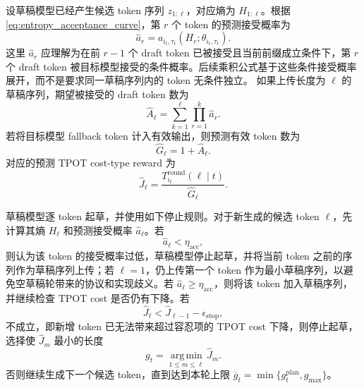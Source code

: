 \documentclass[11pt,a4paper]{ctexart}
\newcommand{\argmin}{\operatorname*{arg\,min}}
\begin{document}
设草稿模型已经产生候选 token 序列 $z_{1:\ell}$，对应熵为 $H_{1:\ell}$。根据 \cref{eq:entropy_acceptance_curve}，第 $r$ 个 token 的预测接受概率为
\begin{equation}
    \widehat{a}_r
    =
    a_{i_t,\tau_t}(H_r;\theta_{i_t,\tau_t}).
\end{equation}
这里 $\widehat{a}_r$ 应理解为在前 $r-1$ 个 draft token 已被接受且当前前缀成立条件下，第 $r$ 个 draft token 被目标模型接受的条件概率。后续乘积公式基于这些条件接受概率展开，而不是要求同一草稿序列内的 token 无条件独立。
如果上传长度为 $\ell$ 的草稿序列，期望被接受的 draft token 数为
\begin{equation}
    \widehat{A}_{\ell}
    =
    \sum_{k=1}^{\ell}
    \prod_{r=1}^{k}\widehat{a}_r.
    \label{eq:entropy_expected_acceptance}
\end{equation}
若将目标模型 fallback token 计入有效输出，则预测有效 token 数为
\begin{equation}
    \widehat{G}_{\ell}
    =
    1+\widehat{A}_{\ell}.
    \label{eq:entropy_expected_valid_tokens}
\end{equation}
对应的预测 TPOT cost-type reward 为
\begin{equation}
    \widehat{J}_{\ell}
    =
    \frac{T_{i_t}^{\mathrm{round}}(\ell\mid t)}
    {\widehat{G}_{\ell}}.
    \label{eq:entropy_rate}
\end{equation}

草稿模型逐 token 起草，并使用如下停止规则。对于新生成的候选 token $\ell$，先计算其熵 $H_\ell$ 和预测接受概率 $\widehat{a}_\ell$。若
\begin{equation}
    \widehat{a}_\ell < \eta_{\mathrm{acc}},
    \label{eq:entropy_threshold_stop}
\end{equation}
则认为该 token 的接受概率过低，草稿模型停止起草，并将当前 token 之前的序列作为草稿序列上传；若 $\ell=1$，仍上传第一个 token 作为最小草稿序列，以避免空草稿轮带来的协议和实现歧义。若 $\widehat{a}_\ell\geq\eta_{\mathrm{acc}}$，则将该 token 加入草稿序列，并继续检查 TPOT cost 是否仍有下降。若
\begin{equation}
    \widehat{J}_{\ell}
    <
    \widehat{J}_{\ell-1}
    -
    \epsilon_{\mathrm{stop}},
    \label{eq:rate_stop}
\end{equation}
不成立，即新增 token 已无法带来超过容忍项的 TPOT cost 下降，则停止起草，选择使 $\widehat{J}_{m}$ 最小的长度
\begin{equation}
    g_t
    =
    \argmin_{1\leq m\leq \ell}
    \widehat{J}_{m}.
    \label{eq:best_dynamic_length}
\end{equation}
否则继续生成下一个候选 token，直到达到本轮上限 $\overline{g}_t=\min\{g_t^{\mathrm{plan}},g_{\max}\}$。
\end{document}

